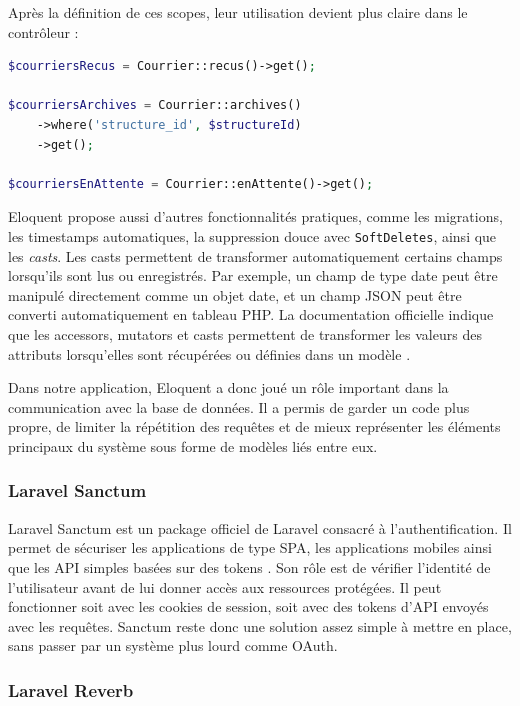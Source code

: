 Après la définition de ces scopes, leur utilisation devient plus claire dans le contrôleur :

\begin{lstlisting}[language=PHP, caption={Utilisation des scopes dans un contrôleur}]
$courriersRecus = Courrier::recus()->get();

$courriersArchives = Courrier::archives()
    ->where('structure_id', $structureId)
    ->get();

$courriersEnAttente = Courrier::enAttente()->get();
\end{lstlisting}

Eloquent propose aussi d’autres fonctionnalités pratiques, comme les migrations, les timestamps automatiques, la suppression douce avec \texttt{SoftDeletes}, ainsi que les \textit{casts}. Les casts permettent de transformer automatiquement certains champs lorsqu’ils sont lus ou enregistrés. Par exemple, un champ de type date peut être manipulé directement comme un objet date, et un champ JSON peut être converti automatiquement en tableau PHP. La documentation officielle indique que les accessors, mutators et casts permettent de transformer les valeurs des attributs lorsqu’elles sont récupérées ou définies dans un modèle \cite{laravel_mutators}.

Dans notre application, Eloquent a donc joué un rôle important dans la communication avec la base de données. Il a permis de garder un code plus propre, de limiter la répétition des requêtes et de mieux représenter les éléments principaux du système sous forme de modèles liés entre eux.

\subsubsection{Laravel Sanctum}
\label{subsubsec:sanctum}
Laravel Sanctum est un package officiel de Laravel consacré à l’authentification. Il permet de sécuriser les applications de type SPA, les applications mobiles ainsi que les API simples basées sur des tokens \cite{laravel_sanctum}. Son rôle est de vérifier l’identité de l’utilisateur avant de lui donner accès aux ressources protégées. Il peut fonctionner soit avec les cookies de session, soit avec des tokens d’API envoyés avec les requêtes. Sanctum reste donc une solution assez simple à mettre en place, sans passer par un système plus lourd comme OAuth.

\subsubsection{Laravel Reverb}
\label{subsubsec:reverb}


